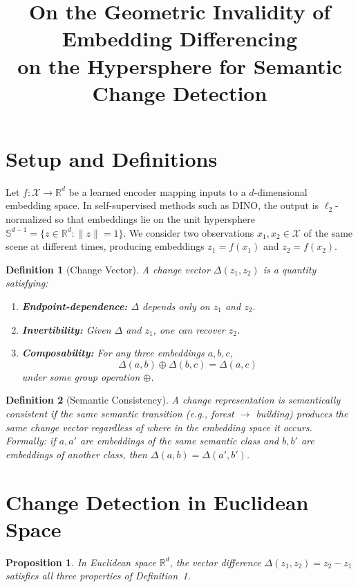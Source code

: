 \documentclass[12pt]{article}
\title{On the Geometric Invalidity of Embedding Differencing\\on the Hypersphere for Semantic Change Detection}
\author{}
\date{}
\newtheorem{definition}{Definition}
\newtheorem{proposition}{Proposition}
\begin{document}
\maketitle

\section{Setup and Definitions}

Let $f : \mathcal{X} \to \mathbb{R}^d$ be a learned encoder mapping inputs to a $d$-dimensional embedding space. In self-supervised methods such as DINO, the output is $\ell_2$-normalized so that embeddings lie on the unit hypersphere $\mathbb{S}^{d-1} = \{ z \in \mathbb{R}^d : \|z\| = 1 \}$. We consider two observations $x_1, x_2 \in \mathcal{X}$ of the same scene at different times, producing embeddings $z_1 = f(x_1)$ and $z_2 = f(x_2)$.

\begin{definition}[Change Vector]
A \emph{change vector} $\Delta(z_1, z_2)$ is a quantity satisfying:
\begin{enumerate}
    \item[(i)] \textbf{Endpoint-dependence:} $\Delta$ depends only on $z_1$ and $z_2$.
    \item[(ii)] \textbf{Invertibility:} Given $\Delta$ and $z_1$, one can recover $z_2$.
    \item[(iii)] \textbf{Composability:} For any three embeddings $a, b, c$,
    \[
        \Delta(a, b) \oplus \Delta(b, c) = \Delta(a, c)
    \]
    under some group operation $\oplus$.
\end{enumerate}
\end{definition}

\begin{definition}[Semantic Consistency]
A change representation is \emph{semantically consistent} if the same semantic transition (e.g., forest $\to$ building) produces the same change vector regardless of where in the embedding space it occurs. Formally: if $a, a'$ are embeddings of the same semantic class and $b, b'$ are embeddings of another class, then $\Delta(a, b) = \Delta(a', b')$.
\end{definition}

\section{Change Detection in Euclidean Space}

\begin{proposition}
In Euclidean space $\mathbb{R}^d$, the vector difference $\Delta(z_1, z_2) = z_2 - z_1$ satisfies all three properties of Definition~1.
\end{proposition}
\end{document}

